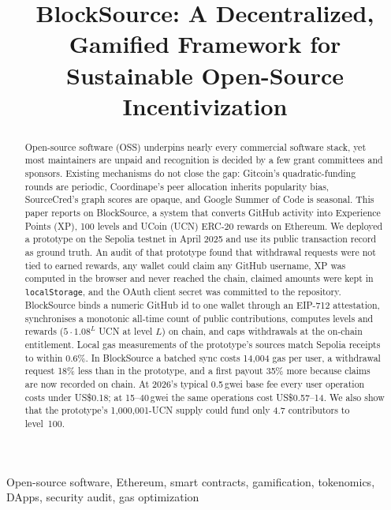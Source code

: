 \documentclass[conference]{IEEEtran}
\begin{document}
\title{BlockSource: A Decentralized, Gamified Framework for Sustainable Open-Source Incentivization}

\author{
}

\maketitle

\begin{abstract}
Open-source software (OSS) underpins nearly every commercial software stack, yet most maintainers are unpaid and recognition is decided by a few grant committees and sponsors. Existing mechanisms do not close the gap: Gitcoin's quadratic-funding rounds are periodic, Coordinape's peer allocation inherits popularity bias, SourceCred's graph scores are opaque, and Google Summer of Code is seasonal. This paper reports on BlockSource, a system that converts GitHub activity into Experience Points (XP), 100 levels and UCoin (UCN) ERC-20 rewards on Ethereum. We deployed a prototype on the Sepolia testnet in April 2025 and use its public transaction record as ground truth. An audit of that prototype found that withdrawal requests were not tied to earned rewards, any wallet could claim any GitHub username, XP was computed in the browser and never reached the chain, claimed amounts were kept in \texttt{localStorage}, and the OAuth client secret was committed to the repository. BlockSource binds a numeric GitHub id to one wallet through an EIP-712 attestation, synchronises a monotonic all-time count of public contributions, computes levels and rewards ($5 \cdot 1.08^{L}$ UCN at level $L$) on chain, and caps withdrawals at the on-chain entitlement. Local gas measurements of the prototype's sources match Sepolia receipts to within 0.6\%. In BlockSource a batched sync costs 14{,}004 gas per user, a withdrawal request 18\% less than in the prototype, and a first payout 35\% more because claims are now recorded on chain. At 2026's typical 0.5\,gwei base fee every user operation costs under US\$0.18; at 15--40\,gwei the same operations cost US\$0.57--14. We also show that the prototype's 1{,}000{,}001-UCN supply could fund only 4.7 contributors to level~100.
\end{abstract}

\begin{IEEEkeywords}
Open-source software, Ethereum, smart contracts, gamification, tokenomics, DApps, security audit, gas optimization
\end{IEEEkeywords}
\end{document}
